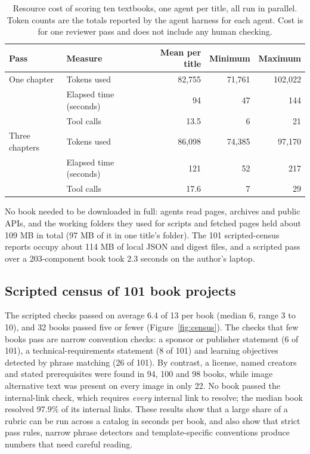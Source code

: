 \begin{table}[htbp]
\centering
\caption{Resource cost of scoring ten textbooks, one agent per title, all run in parallel. Token counts are the totals reported by the agent harness for each agent. Cost is for one reviewer pass and does not include any human checking.}
\label{tab:cost}
\small
\begin{tabular}{@{}llrrr@{}}
\toprule
Pass & Measure & Mean per title & Minimum & Maximum \\
\midrule
One chapter & Tokens used & 82{,}755 & 71{,}761 & 102{,}022 \\
 & Elapsed time (seconds) & 94 & 47 & 144 \\
 & Tool calls & 13.5 & 6 & 21 \\
\addlinespace
Three chapters & Tokens used & 86{,}098 & 74{,}385 & 97{,}170 \\
 & Elapsed time (seconds) & 121 & 52 & 217 \\
 & Tool calls & 17.6 & 7 & 29 \\
\bottomrule
\end{tabular}
\end{table}

No book needed to be downloaded in full: agents read pages, archives and public APIs, and the working folders they used for scripts and fetched pages held about 109 MB in total (97 MB of it in one title's folder). The 101 scripted-census reports occupy about 114 MB of local JSON and digest files, and a scripted pass over a 203-component book took 2.3 seconds on the author's laptop.

\subsection{Scripted census of 101 book projects}
\label{sec:census}
The scripted checks passed on average 6.4 of 13 per book (median 6, range 3 to 10), and 32 books passed five or fewer (Figure~\ref{fig:census}). The checks that few books pass are narrow convention checks: a sponsor or publisher statement (6 of 101), a technical-requirements statement (8 of 101) and learning objectives detected by phrase matching (26 of 101). By contrast, a license, named creators and stated prerequisites were found in 94, 100 and 98 books, while image alternative text was present on every image in only 22. No book passed the internal-link check, which requires \emph{every} internal link to resolve; the median book resolved 97.9\% of its internal links. These results show that a large share of a rubric can be run across a catalog in seconds per book, and also show that strict pass rules, narrow phrase detectors and template-specific conventions produce numbers that need careful reading.

